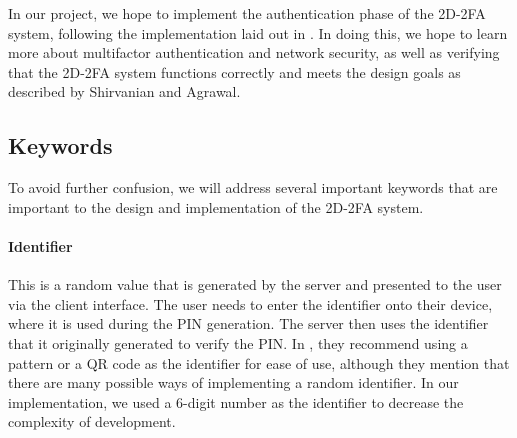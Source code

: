 \documentclass[11pt]{article} %
\begin{document}
In our project, we hope to implement the authentication phase of the
2D-2FA system, following the implementation laid out in
\cite{shirvanian2d2fa}. In doing this, we hope to learn more about
multifactor authentication and network security, as well as verifying
that the 2D-2FA system functions correctly and meets the design goals as
described by Shirvanian and Agrawal. 



\subsection{Keywords}

To avoid further confusion, we will address several important keywords
that are important to the design and implementation of the 2D-2FA
system. 


\paragraph{Identifier} This is a random value that is generated by the
server and presented to the user via the client interface. The user
needs to enter the identifier onto their device, where it is used during
the PIN generation. The server then uses the identifier that it
originally generated to verify the PIN. In \cite{shirvanian2d2fa}, they
recommend using a pattern or a QR code as the identifier for ease of
use, although they mention that there are many possible ways of
implementing a random identifier. In our implementation, we used a
6-digit number as the identifier to decrease the complexity of
development. 
\end{document}
